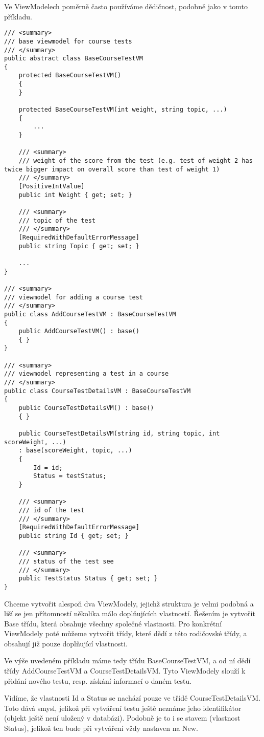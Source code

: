 Ve ViewModelech poměrně často používáme dědičnost, podobně jako v tomto příkladu.
\begin{lstlisting}
/// <summary>
/// base viewmodel for course tests
/// </summary>
public abstract class BaseCourseTestVM
{
	protected BaseCourseTestVM()
	{
	}
	
	protected BaseCourseTestVM(int weight, string topic, ...)
	{
		...
	}
	
	/// <summary>
	/// weight of the score from the test (e.g. test of weight 2 has twice bigger impact on overall score than test of weight 1)
	/// </summary>
	[PositiveIntValue]
	public int Weight { get; set; }
	
	/// <summary>
	/// topic of the test
	/// </summary>
	[RequiredWithDefaultErrorMessage]
	public string Topic { get; set; }

	...
}

/// <summary>
/// viewmodel for adding a course test
/// </summary>
public class AddCourseTestVM : BaseCourseTestVM
{
	public AddCourseTestVM() : base()
	{ }
}

/// <summary>
/// viewmodel representing a test in a course
/// </summary>
public class CourseTestDetailsVM : BaseCourseTestVM
{
	public CourseTestDetailsVM() : base()
	{ }
	
	public CourseTestDetailsVM(string id, string topic, int scoreWeight, ...)
	: base(scoreWeight, topic, ...)
	{
		Id = id;
		Status = testStatus;
	}
	
	/// <summary>
	/// id of the test
	/// </summary>
	[RequiredWithDefaultErrorMessage]
	public string Id { get; set; }
	
	/// <summary>
	/// status of the test see
	/// </summary>
	public TestStatus Status { get; set; }
}
\end{lstlisting}
Chceme vytvořit alespoň dva ViewModely, jejichž struktura je velmi podobná a liší se jen přítomností několika málo doplňujících vlastností. Řešením je vytvořit Base třídu, která obsahuje všechny společné vlastnosti. Pro konkrétní ViewModely poté můžeme vytvořit třídy, které dědí z této rodičovské třídy, a obsahují již pouze doplňující vlastnosti.

Ve výše uvedeném příkladu máme tedy třídu BaseCourseTestVM, a od ní dědí třídy AddCourseTestVM a CourseTestDetailsVM. Tyto ViewModely slouží k přidání nového testu, resp. získání informací o daném testu.

Vidíme, že vlastnosti Id a Status se nachází pouze ve třídě CourseTestDetailsVM. Toto dává smysl, jelikož při vytváření testu ještě neznáme jeho identifikátor (objekt ještě není uložený v databázi).
Podobně je to i se stavem (vlastnost Status), jelikož ten bude při vytváření vždy nastaven na New.

